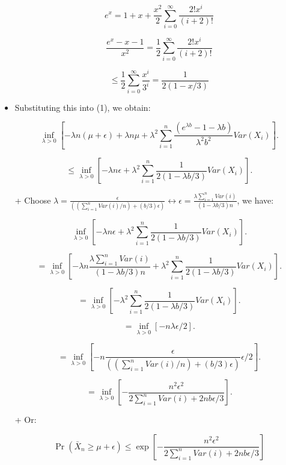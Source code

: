 \documentclass{article}
\begin{document}
\begin{itemize}
    \[
    e^x = 1 + x + \frac{x^2}{2}\sum_{i=0}^\infty \frac{2!x^i}{(i + 2)!}
    \]

    \[
    \frac{e^x - x - 1}{x^2} = \frac{1}{2}\sum_{i=0}^\infty \frac{2!x^i}{(i + 2)!}
    \]

    \[
    \leq \frac{1}{2}\sum_{i=0}^\infty \frac{x^i}{3^i} = \frac{1}{2(1 - x/3)}
    \]

    \item Substituting this into (1), we obtain:

    \[
    \inf_{\lambda>0} 
    \left[ -\lambda n(\mu + \epsilon) +  \lambda n \mu + \lambda ^ 2 \sum_{i=1}^n\frac{(e^{\lambda b} - 1 - \lambda b)}{\lambda^2 b^2}Var(X_i) \right]. 
    \]

    \[
    \leq \inf_{\lambda>0} 
    \left[ -\lambda n\epsilon + \lambda ^ 2 \sum_{i=1}^n\frac{1}{2(1 - \lambda b/3)} Var(X_i) \right].
    \]

    \item[+] Choose $\lambda = \frac{\epsilon}{((\sum_{i = 1}^{n}Var(i) / n) + (b /3) \epsilon)} \leftrightarrow \epsilon = \frac{\lambda \sum_{i = 1}^{n}Var(i)}{(1 -  \lambda b /3) n}$, we have:

    \[
    \inf_{\lambda>0} 
    \left[ -\lambda n\epsilon + \lambda ^ 2 \sum_{i=1}^n\frac{1}{2(1 - \lambda b/3)} Var(X_i) \right].
    \]

    \[
    = \inf_{\lambda>0} 
    \left[ -\lambda n \frac{\lambda \sum_{i = 1}^{n}Var(i)}{(1 -  \lambda b /3)n} + \lambda ^ 2 \sum_{i=1}^n\frac{1}{2(1 - \lambda b/3)} Var(X_i) \right].
    \]

    \[
    = \inf_{\lambda>0} 
    \left[ - \lambda ^ 2 \sum_{i=1}^n\frac{1}{2(1 - \lambda b/3)} Var(X_i) \right].
    \]

    \[
    = \inf_{\lambda>0} 
    \left[ - n \lambda \epsilon / 2 \right].
    \]

    \[
    = \inf_{\lambda>0} 
    \left[ - n \frac{\epsilon}{((\sum_{i = 1}^{n}Var(i) / n) + (b /3) \epsilon)} \epsilon / 2 \right].
    \]

    \[
    = \inf_{\lambda>0} 
    \left[ -\frac{n ^ 2 \epsilon ^ 2}{2\sum_{i = 1}^{n}Var(i) + 2nb\epsilon /3} \right].
    \]

    \item[+] Or:

    \[
    \Pr(\bar{X}_n \geq \mu + \epsilon) \leq \exp\left[ -\frac{n ^ 2 \epsilon ^ 2}{2\sum_{i = 1}^{n}Var(i) + 2nb\epsilon /3} \right]
    \]
\end{itemize}
\end{document}
